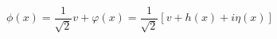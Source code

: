 \begin{equation}\phi(x)=
\frac{1}{\sqrt 2} v + \varphi(x) = \frac{1}{\sqrt 2}[ v + h(x) + i
\eta(x)]\end{equation}

